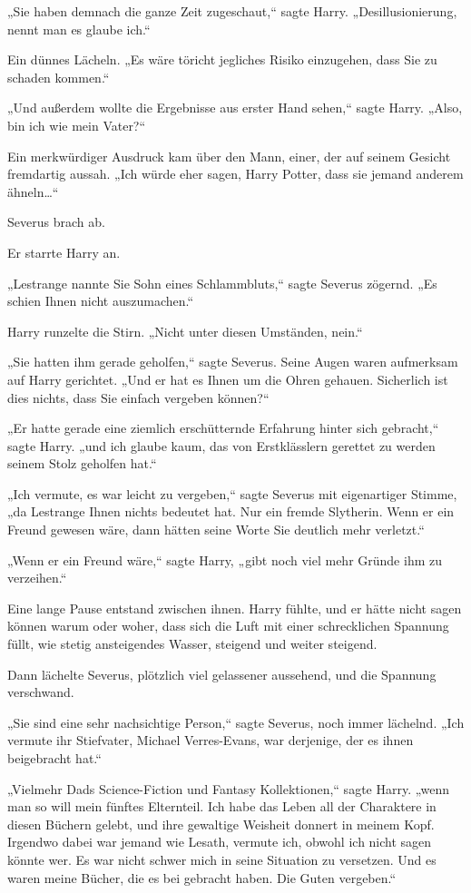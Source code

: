 {„Sie haben demnach die ganze Zeit zugeschaut,“ sagte Harry. „Desillusionierung, nennt man es glaube ich.“

Ein dünnes Lächeln. „Es wäre töricht jegliches Risiko einzugehen, dass Sie zu schaden kommen.“

„Und außerdem wollte die Ergebnisse aus erster Hand sehen,“ sagte Harry. „Also, bin ich wie mein Vater?“

Ein merkwürdiger Ausdruck kam über den Mann, einer, der auf seinem Gesicht fremdartig aussah. „Ich würde eher sagen, Harry Potter, dass sie jemand anderem ähneln…“

Severus brach ab.

Er starrte Harry an.

„Lestrange nannte Sie Sohn eines Schlammbluts,“ sagte Severus zögernd. „Es schien Ihnen nicht auszumachen.“

Harry runzelte die Stirn. „Nicht unter diesen Umständen, nein.“

„Sie hatten ihm gerade geholfen,“ sagte Severus. Seine Augen waren aufmerksam auf Harry gerichtet. „Und er hat es Ihnen um die Ohren gehauen. Sicherlich ist dies nichts, dass Sie einfach vergeben können?“

„Er hatte gerade eine ziemlich erschütternde Erfahrung hinter sich gebracht,“ sagte Harry. „und ich glaube kaum, das von Erstklässlern gerettet zu werden seinem Stolz geholfen hat.“

„Ich vermute, es war leicht zu vergeben,“ sagte Severus mit eigenartiger Stimme, „da Lestrange Ihnen nichts bedeutet hat. Nur ein fremde Slytherin. Wenn er ein Freund gewesen wäre, dann hätten seine Worte Sie deutlich mehr verletzt.“

„Wenn er ein Freund wäre,“ sagte Harry, „gibt noch viel mehr Gründe ihm zu verzeihen.“

Eine lange Pause entstand zwischen ihnen. Harry fühlte, und er hätte nicht sagen können warum oder woher, dass sich die Luft mit einer schrecklichen Spannung füllt, wie stetig ansteigendes Wasser, steigend und weiter steigend.

Dann lächelte Severus, plötzlich viel gelassener aussehend, und die Spannung verschwand.

„Sie sind eine sehr nachsichtige Person,“ sagte Severus, noch immer lächelnd. „Ich vermute ihr Stiefvater, Michael Verres-Evans, war derjenige, der es ihnen beigebracht hat.“

„Vielmehr Dads Science-Fiction und Fantasy Kollektionen,“ sagte Harry. „wenn man so will mein fünftes Elternteil. Ich habe das Leben all der Charaktere in diesen Büchern gelebt, und ihre gewaltige Weisheit donnert in meinem Kopf. Irgendwo dabei war jemand wie Lesath, vermute ich, obwohl ich nicht sagen könnte wer. Es war nicht schwer mich in seine Situation zu versetzen. Und es waren meine Bücher, die es bei gebracht haben. Die Guten vergeben.“

}
